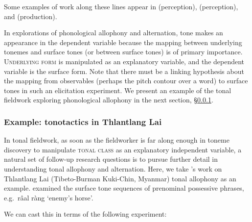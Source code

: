 \documentclass[12pt]{article}
\begin{document}
Some examples of work along these lines appear in \citet{Connell:2000}
(perception), \citet{Khouw:2007} (perception), and \citet{DiCanio:2009} (production).

In explorations of phonological allophony and alternation, tone makes
an appearance in the dependent variable because the mapping
between underlying tonemes and surface tones (or between surface tones) is of primary
importance. \textsc{Underlying form} is manipulated as an
explanatory variable, and the dependent variable is the surface
form. Note that there must be a linking hypothesis about the mapping
from observables (perhaps the pitch contour over a word) to surface
tones in such an elicitation experiment. We present an example of the
tonal fieldwork exploring phonological allophony in the next section, \S\ref{sec:tonotactics}.

\subsubsection{Example: tonotactics in Thlantlang Lai \citep{Hyman:2007}}
\label{sec:tonotactics}

 In
tonal fieldwork, as soon as the fieldworker is far along enough in toneme
discovery to manipulate \textsc{tonal class} as an explanatory
independent variable, a natural set of follow-up
research questions is to pursue further detail in understanding tonal
allophony and alternation. Here, we take \citet{Hyman:2007}'s work on
Thlantlang Lai (Tibeto-Burman Kuki-Chin, Myanmar) tonal allophony as an example. \citet{Hyman:2007}
examined the surface tone sequences of prenominal possessive phrases,
e.g.\ r\^{a}al r\`ang `enemy's horse'. 

We can cast this in terms of the following experiment:
\end{document}
